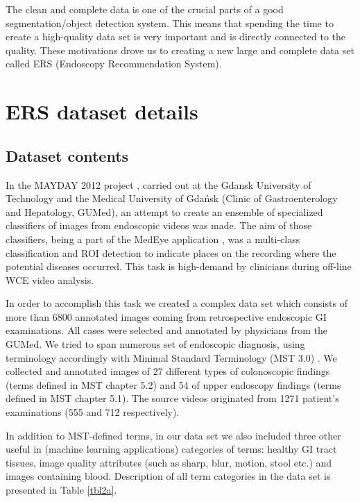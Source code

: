 \documentclass[preprint]{article}
\begin{document}
 The clean and complete data is one of the crucial parts of a good segmentation/object detection system. This means that spending the time to create a high-quality data set is very important and is directly connected to the quality. These motivations drove us to creating a new large and complete data set called ERS (Endoscopy Recommendation System).




\section{ERS dataset details}

\subsection{Dataset contents}

In the MAYDAY 2012 project \cite{Blokus2012}, carried out at the Gdansk University of Technology and the Medical University of Gdańsk (Clinic of Gastroenterology and Hepatology, GUMed), an attempt to create an ensemble of specialized classifiers of images from endoscopic videos was made. The aim of those classifiers, being a part of the MedEye application \cite{Krawczyk2012}, was a multi-class classification and ROI detection to indicate places on the recording where the potential diseases occurred. This task is high-demand by clinicians during off-line WCE video analysis.

In order to accomplish this task we created a complex data set which consists of more than 6800 annotated images coming from retrospective endoscopic GI examinations. All cases were selected and annotated by physicians from the GUMed. We tried to span numerous set of endoscopic diagnosis, using terminology accordingly with Minimal Standard Terminology (MST 3.0) \cite{MST}. We collected and annotated images of 27 different types of colonoscopic findings (terms defined in MST chapter 5.2) and 54 of upper endoscopy findings (terms defined in MST chapter 5.1). The source videos originated from 1271 patient’s examinations (555 and 712 respectively).

In addition to MST-defined terms, in our data set we also included three other useful in (machine learning applications) categories of terms: healthy GI tract tissues, image quality attributes (such as sharp, blur, motion, stool etc.) and images containing blood. Description of all term categories in the data set is presented in Table \ref{tbl2a}.
\end{document}
